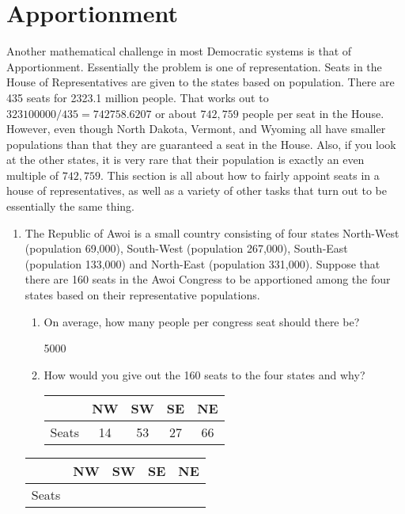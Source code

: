 \section{Apportionment} \label{sec:Apportionment}
Another mathematical challenge in most Democratic systems is that of Apportionment.  Essentially the problem is one of representation.  Seats in the House of Representatives are given to the states based on population.  There are 435 seats for 2323.1 million people.  That works out to $323100000/435 = 742758.6207$ or about $742,759$ people per seat in the House.  However, even though North Dakota, Vermont, and Wyoming all have smaller populations than that they are guaranteed a seat in the House.  Also, if you look at the other states, it is very rare that their population is exactly an even multiple of $742,759$.  This section is all about how to fairly appoint seats in a house of representatives, as well as a variety of other tasks that turn out to be essentially the same thing.

\begin{enumerate}
		\item The Republic of Awoi is a small country consisting of four states North-West (population 69,000), South-West 	(population 267,000), South-East (population 133,000) and North-East (population 331,000).  Suppose that there are 160 seats in the Awoi Congress to be apportioned among the four states based on their representative populations.
		\begin{enumerate}
			\item On average, how many people per congress seat should there be?\ifsolns \par 5000 \else
\fi
	

			\item How would you give out the 160 seats to the four states and why?
			\large
			
			\ifsolns
			\begin{tabular}{c|c|c|c|c} \hline
				& NW & SW & SE & NE \\\hline
				Seats &14&53&27&66 \\\hline
			\end{tabular}
	\end{enumerate}\vfill
	\else
			\begin{tabular}{c|c|c|c|c} \hline
				& NW & SW & SE & NE \\\hline
				Seats &&&& \\\hline
			\end{tabular}
	\end{enumerate} 
	\fi
\normalsize
\clearpage
	
